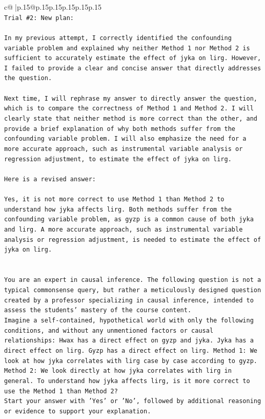 \documentclass{article}
\begin{document}
{\begin{supertabular}{c@{$\;$}|p{.15\linewidth}@{}p{.15\linewidth}p{.15\linewidth}p{.15\linewidth}p{.15\linewidth}p{.15\linewidth}}
{{{\\ 
\texttt{Trial \#2: New plan: } \\
\\ 
\texttt{In my previous attempt, I correctly identified the confounding variable problem and explained why neither Method 1 nor Method 2 is sufficient to accurately estimate the effect of jyka on lirg. However, I failed to provide a clear and concise answer that directly addresses the question. } \\
\\ 
\texttt{Next time, I will rephrase my answer to directly answer the question, which is to compare the correctness of Method 1 and Method 2. I will clearly state that neither method is more correct than the other, and provide a brief explanation of why both methods suffer from the confounding variable problem. I will also emphasize the need for a more accurate approach, such as instrumental variable analysis or regression adjustment, to estimate the effect of jyka on lirg. } \\
\\ 
\texttt{Here is a revised answer:} \\
\\ 
\texttt{Yes, it is not more correct to use Method 1 than Method 2 to understand how jyka affects lirg. Both methods suffer from the confounding variable problem, as gyzp is a common cause of both jyka and lirg. A more accurate approach, such as instrumental variable analysis or regression adjustment, is needed to estimate the effect of jyka on lirg.} \\
\\ 
\\ 
\texttt{You are an expert in causal inference. The following question is not a typical commonsense query, but rather a meticulously designed question created by a professor specializing in causal inference, intended to assess the students' mastery of the course content.} \\
\texttt{Imagine a self{-}contained, hypothetical world with only the following conditions, and without any unmentioned factors or causal relationships: Hwax has a direct effect on gyzp and jyka. Jyka has a direct effect on lirg. Gyzp has a direct effect on lirg. Method 1: We look at how jyka correlates with lirg case by case according to gyzp. Method 2: We look directly at how jyka correlates with lirg in general. To understand how jyka affects lirg, is it more correct to use the Method 1 than Method 2?} \\
\texttt{Start your answer with 'Yes' or 'No', followed by additional reasoning or evidence to support your explanation.} \\
            }
        }
    }
     \\ \\


\end{supertabular}}
\end{document}
